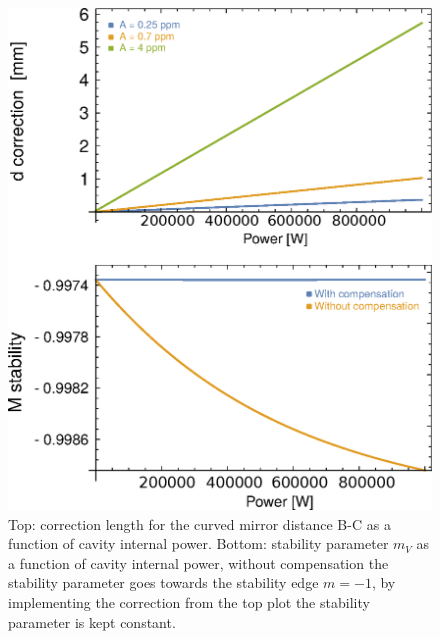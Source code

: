 \begin{figure}
	\centering
	\includegraphics[width=0.9\linewidth]{images/compensation.eps}
	\caption{Top: correction length for the curved mirror distance B-C as a function of cavity internal power. Bottom: stability parameter $m_V$ as a function of cavity internal power, without compensation the stability parameter goes towards the stability edge $m=-1$, by implementing the correction from the top plot the stability parameter is kept constant.}
	\label{fig:compensation}
\end{figure}
